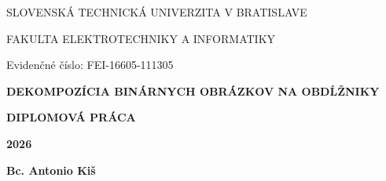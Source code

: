 \documentclass[12pt]{report}
\begin{document}
\begin{titlepage}
    \centering

    {\Large\textbf{}{SLOVENSKÁ TECHNICKÁ UNIVERZITA V BRATISLAVE \par
    FAKULTA ELEKTROTECHNIKY A INFORMATIKY \par}}

    \vspace{2cm}

    \begin{flushleft}
        Evidenčné číslo: FEI-16605-111305
    \end{flushleft}

    \vspace{5cm}
    {\Large\textbf{DEKOMPOZÍCIA BINÁRNYCH OBRÁZKOV NA OBDĹŽNIKY}\par}
    \vspace{1cm}
    {\large\textbf{DIPLOMOVÁ PRÁCA}}

    \vfill

    \begin{minipage}[t]{0.5\textwidth}
        \raggedright
        \normalsize{\textbf{2026}}
    \end{minipage}%
    \begin{minipage}[t]{0.5\textwidth}
        \raggedleft
        \normalsize{\textbf{Bc. Antonio Kiš}}
    \end{minipage}
\end{titlepage}










\end{document}
